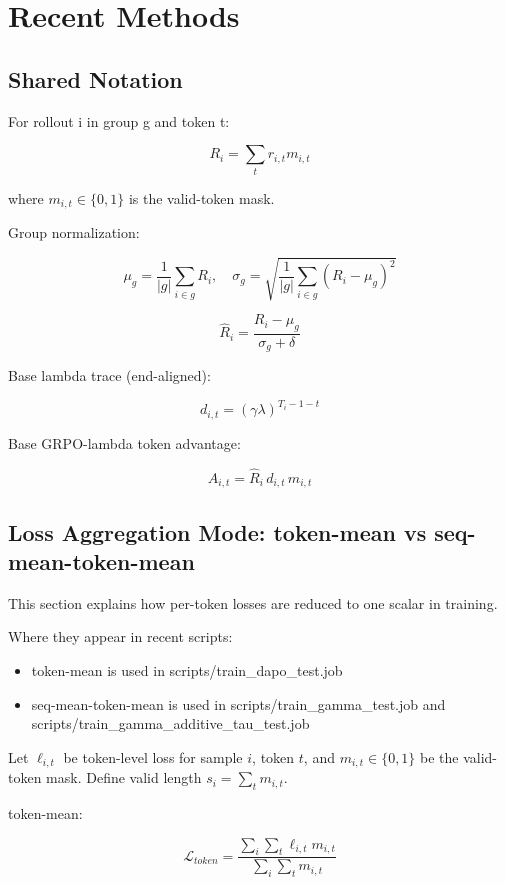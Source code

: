 \documentclass[
]{article}
\author{}
\date{}
\providecommand{\tightlist}{%
  \setlength{\itemsep}{0pt}\setlength{\parskip}{0pt}}
\begin{document}
\section{Recent Methods}\label{recent-methods}

\subsection{Shared Notation}\label{shared-notation}

For rollout i in group g and token t:

\[
R_i = \sum_t r_{i,t} m_{i,t}
\]

where \(m_{i,t}\in\{0,1\}\) is the valid-token mask.

Group normalization:

\[
\mu_g = \frac{1}{|g|}\sum_{i\in g} R_i, \quad
\sigma_g = \sqrt{\frac{1}{|g|}\sum_{i\in g}(R_i-\mu_g)^2}
\]

\[
\hat{R}_i = \frac{R_i-\mu_g}{\sigma_g + \delta}
\]

Base lambda trace (end-aligned):

\[
d_{i,t} = (\gamma\lambda)^{T_i-1-t}
\]

Base GRPO-lambda token advantage:

\[
A_{i,t} = \hat{R}_i\, d_{i,t}\, m_{i,t}
\]

\subsection{Loss Aggregation Mode: token-mean vs
seq-mean-token-mean}\label{loss-aggregation-mode-token-mean-vs-seq-mean-token-mean}

This section explains how per-token losses are reduced to one scalar in
training.

Where they appear in recent scripts:

\begin{itemize}
\tightlist
\item
  token-mean is used in scripts/train\_dapo\_test.job
\item
  seq-mean-token-mean is used in scripts/train\_gamma\_test.job and
  scripts/train\_gamma\_additive\_tau\_test.job
\end{itemize}

Let \(\ell_{i,t}\) be token-level loss for sample \(i\), token \(t\),
and \(m_{i,t}\in\{0,1\}\) be the valid-token mask. Define valid length
\(s_i = \sum_t m_{i,t}\).

token-mean:

\[
\mathcal{L}_{token} = \frac{\sum_i\sum_t \ell_{i,t} m_{i,t}}{\sum_i\sum_t m_{i,t}}
\]
\end{document}
